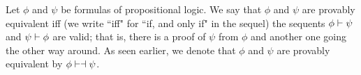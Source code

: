     \par Let $\phi$ and $\psi$ be formulas of propositional logic. We say
that $\phi$ and $\psi$ are provably equivalent iff (we write ``iff" for ``if, and only if" in the sequel) the sequents $\phi \vdash \psi$ and $\psi \vdash \phi$ are valid; that is, there is a proof of $\psi$ from $\phi$ and another one going the other way around. As seen earlier, we denote that $\phi$ and $\psi$ are provably equivalent by $\phi \vdash \dashv \psi$.